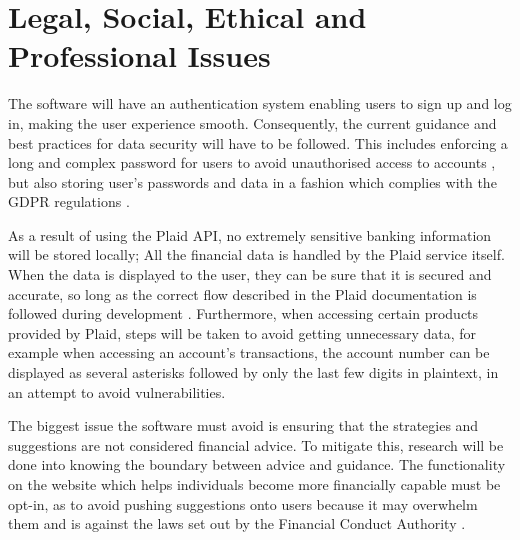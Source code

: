 \section{Legal, Social, Ethical and Professional Issues}
The software will have an authentication system enabling users to sign up and log in, making the user experience smooth. Consequently, the current guidance and best practices for data security will have to be followed. This includes enforcing a long and complex password for users to avoid unauthorised access to accounts \cite{PasswordRequirements}, but also storing user's passwords and data in a fashion which complies with the GDPR regulations \cite{GDPR}.

As a result of using the Plaid API, no extremely sensitive banking information will be stored locally; All the financial data is handled by the Plaid service itself. When the data is displayed to the user, they can be sure that it is secured and accurate, so long as the correct flow described in the Plaid documentation is followed during development \cite{PlaidGettingStarted}. Furthermore, when accessing certain products provided by Plaid, steps will be taken to avoid getting unnecessary data, for example when accessing an account's transactions, the account number can be displayed as several asterisks followed by only the last few digits in plaintext, in an attempt to avoid vulnerabilities.

The biggest issue the software must avoid is ensuring that the strategies and suggestions are not considered financial advice. To mitigate this, research will be done into knowing the boundary between advice and guidance. The functionality on the website which helps individuals become more financially capable must be opt-in, as to avoid pushing suggestions onto users because it may overwhelm them and is against the laws set out by the Financial Conduct Authority \cite{AdviceVsGuidance}.